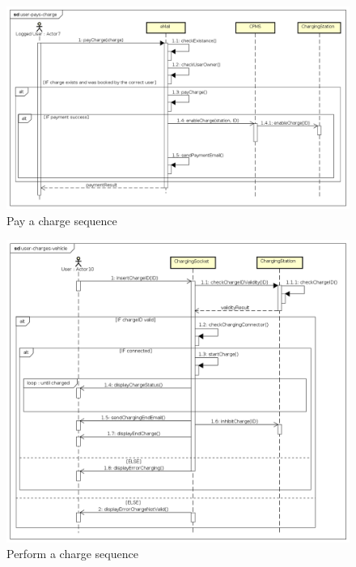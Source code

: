 \begin{figure}[!h]
    \begin{center}
        \includegraphics[keepaspectratio, width=16cm]{Sequence/user-pays-charge.png}
        \caption{Pay a charge sequence}
    \end{center}
\end{figure}
\begin{figure}[!h]
    \begin{center}
        \includegraphics[keepaspectratio, width=16cm]{Sequence/user-charges-vehicle.png}
        \caption{Perform a charge sequence}
    \end{center}
\end{figure}
